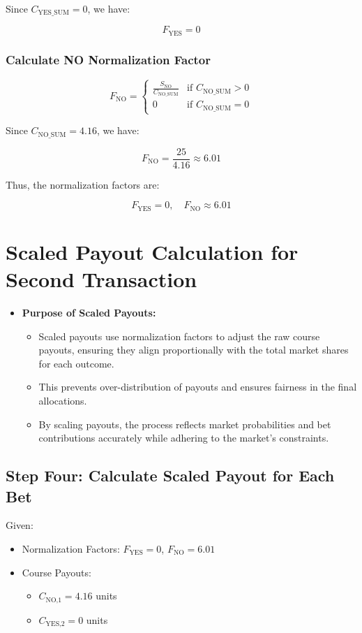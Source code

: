 \documentclass{article}
\begin{document}
Since \( C_{\text{YES\_SUM}} = 0 \), we have:

\[
F_{\text{YES}} = 0
\]

\subsubsection*{Calculate NO Normalization Factor}

\[
F_{\text{NO}} =
\begin{cases}
      \frac{S_{\text{NO}}}{C_{\text{NO\_SUM}}} & \text{if } C_{\text{NO\_SUM}} > 0 \\
      0 & \text{if } C_{\text{NO\_SUM}} = 0
   \end{cases}
\]

Since \( C_{\text{NO\_SUM}} = 4.16 \), we have:

\[
F_{\text{NO}} = \frac{25}{4.16} \approx 6.01
\]

Thus, the normalization factors are:

\[
F_{\text{YES}} = 0, \quad F_{\text{NO}} \approx 6.01
\]

\newpage


\section*{Scaled Payout Calculation for Second Transaction}

\begin{itemize}
    \item \textbf{Purpose of Scaled Payouts:}
    \begin{itemize}
        \item Scaled payouts use normalization factors to adjust the raw course payouts, ensuring they align proportionally with the total market shares for each outcome.
        \item This prevents over-distribution of payouts and ensures fairness in the final allocations.
        \item By scaling payouts, the process reflects market probabilities and bet contributions accurately while adhering to the market's constraints.
    \end{itemize}
\end{itemize}

\subsection*{Step Four: Calculate Scaled Payout for Each Bet}

Given:
\begin{itemize}
    \item Normalization Factors: \( F_{\text{YES}} = 0 \), \( F_{\text{NO}} = 6.01 \)
    \item Course Payouts:
    \begin{itemize}
        \item \( C_{\text{NO,1}} = 4.16 \) units
        \item \( C_{\text{YES,2}} = 0 \) units
    \end{itemize}
\end{itemize}
\end{document}
